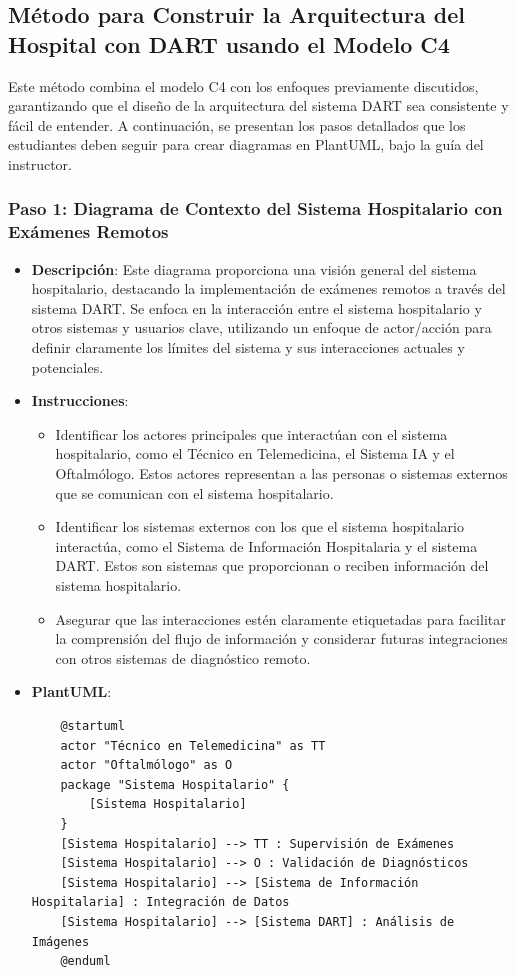 \subsection{Método para Construir la Arquitectura del Hospital con DART usando el Modelo C4}
Este método combina el modelo C4 con los enfoques previamente discutidos, garantizando que el diseño de la arquitectura del sistema DART sea consistente y fácil de entender. A continuación, se presentan los pasos detallados que los estudiantes deben seguir para crear diagramas en PlantUML, bajo la guía del instructor.




\subsubsection{Paso 1: Diagrama de Contexto del Sistema Hospitalario con Exámenes Remotos}

\begin{itemize}
    \item \textbf{Descripción}: Este diagrama proporciona una visión general del sistema hospitalario, destacando la implementación de exámenes remotos a través del sistema DART. Se enfoca en la interacción entre el sistema hospitalario y otros sistemas y usuarios clave, utilizando un enfoque de actor/acción para definir claramente los límites del sistema y sus interacciones actuales y potenciales.
    \item \textbf{Instrucciones}:
    \begin{itemize}
        \item Identificar los actores principales que interactúan con el sistema hospitalario, como el Técnico en Telemedicina, el Sistema IA y el Oftalmólogo. Estos actores representan a las personas o sistemas externos que se comunican con el sistema hospitalario.
        \item Identificar los sistemas externos con los que el sistema hospitalario interactúa, como el Sistema de Información Hospitalaria y el sistema DART. Estos son sistemas que proporcionan o reciben información del sistema hospitalario.
        \item Asegurar que las interacciones estén claramente etiquetadas para facilitar la comprensión del flujo de información y considerar futuras integraciones con otros sistemas de diagnóstico remoto.
    \end{itemize}
    \item \textbf{PlantUML}:
    \begin{verbatim}
    @startuml
    actor "Técnico en Telemedicina" as TT
    actor "Oftalmólogo" as O
    package "Sistema Hospitalario" {
        [Sistema Hospitalario]
    }
    [Sistema Hospitalario] --> TT : Supervisión de Exámenes
    [Sistema Hospitalario] --> O : Validación de Diagnósticos
    [Sistema Hospitalario] --> [Sistema de Información Hospitalaria] : Integración de Datos
    [Sistema Hospitalario] --> [Sistema DART] : Análisis de Imágenes
    @enduml
    \end{verbatim}
\end{itemize}

